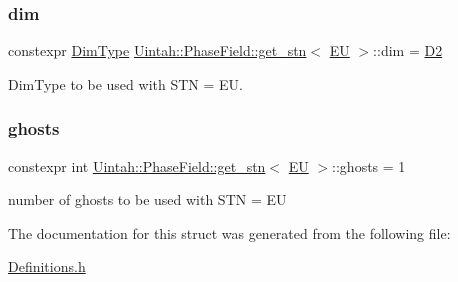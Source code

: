 \subsubsection{\texorpdfstring{dim}{dim}}
{\footnotesize\ttfamily constexpr \hyperlink{namespaceUintah_1_1PhaseField_a12bfc68444894dffdf0cb8d9cf0cc76a}{Dim\+Type} \hyperlink{structUintah_1_1PhaseField_1_1get__stn}{Uintah\+::\+Phase\+Field\+::get\+\_\+stn}$<$ \hyperlink{namespaceUintah_1_1PhaseField_a24d833a720598df1020f5cc2e75f8702a97463475a8bd68261d440a40349a814a}{EU} $>$\+::dim = \hyperlink{namespaceUintah_1_1PhaseField_a12bfc68444894dffdf0cb8d9cf0cc76aa1a451dae278b0103a94105c8776e9a67}{D2}\hspace{0.3cm}{\ttfamily [static]}}



Dim\+Type to be used with S\+TN = EU. 

\mbox{\label{structUintah_1_1PhaseField_1_1get__stn_3_01EU_01_4_a9539e5e243f41b0655de0b67be85dfc7}} 
\subsubsection{\texorpdfstring{ghosts}{ghosts}}
{\footnotesize\ttfamily constexpr int \hyperlink{structUintah_1_1PhaseField_1_1get__stn}{Uintah\+::\+Phase\+Field\+::get\+\_\+stn}$<$ \hyperlink{namespaceUintah_1_1PhaseField_a24d833a720598df1020f5cc2e75f8702a97463475a8bd68261d440a40349a814a}{EU} $>$\+::ghosts = 1\hspace{0.3cm}{\ttfamily [static]}}



number of ghosts to be used with S\+TN = EU 



The documentation for this struct was generated from the following file\+:\begin{DoxyCompactItemize}
\item 
\hyperlink{Definitions_8h}{Definitions.\+h}\end{DoxyCompactItemize}
